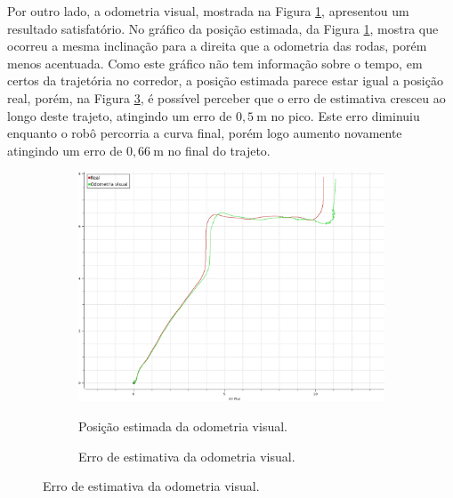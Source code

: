 \documentclass[repeatfields,xlists,xpacks,oneside,yearsonly]{ufrgscca}
\begin{document}
Por outro lado, a odometria visual, mostrada na Figura
\ref{fig:odom_visual}, apresentou um resultado satisfatório. No
gráfico da posição estimada, da Figura \ref{fig:odom_visual}, mostra
que ocorreu a mesma inclinação para a direita que a odometria das
rodas, porém menos acentuada. Como este gráfico não tem informação
sobre o tempo, em certos da trajetória no corredor, a posição
estimada parece estar igual a posição real, porém, na Figura
\ref{fig:odom_visual_error}, é possível perceber que o erro de
estimativa cresceu ao longo deste trajeto, atingindo um erro de
$0,5~\si{\meter}$ no pico. Este erro diminuiu enquanto o robô
percorria a curva final, porém logo aumento novamente atingindo um
erro de $0,66~\si{\meter}$ no final do trajeto.

\begin{figure}[h]
    \caption{Resultado da odometria visual.}
    \label{fig:visual_odom_result}
    \begin{subfigure}{0.5\linewidth}
        {
            \centering
            \caption{Posição estimada da odometria visual.}
            \label{fig:odom_visual}
            \includegraphics[width=0.98\linewidth]{odom-visual.png}\\
        }
    \end{subfigure}
    \begin{subfigure}{0.5\linewidth}
        {
            \centering
            \caption{Erro de estimativa da odometria visual.}
            \label{fig:odom_visual_error}
}
\end{subfigure}
\end{figure}
\end{document}
